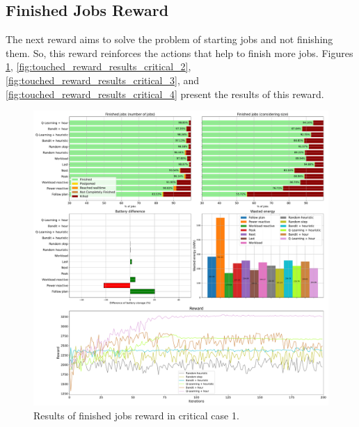 

\clearpage

\subsection{Finished Jobs Reward}

The next reward aims to solve the problem of starting jobs and not finishing them. So, this reward reinforces the actions that help to finish more jobs. Figures \ref{fig:touched_reward_results_critical_1}, \ref{fig:touched_reward_results_critical_2}, \ref{fig:touched_reward_results_critical_3}, and \ref{fig:touched_reward_results_critical_4} present the results of this reward. 

\begin{figure}[!htb]
    \centering
    \includegraphics[scale=0.29]{Images/Learning_compensations/reward_finished_touched_profile_best_workload_1_with_noise_state_delta.pdf}
    \caption{Results of finished jobs reward in critical case 1.}
    \label{fig:touched_reward_results_critical_1}
\end{figure}

